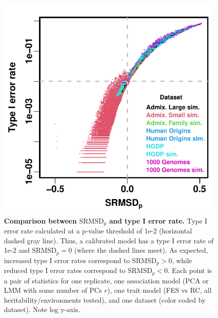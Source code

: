 \documentclass[11pt]{article}
\newcommand{\rmsd}{\text{SRMSD}_p}
\begin{document}
\begin{figure}[hp!]
  \centering
  \includegraphics{rmsd-vs-tie.pdf}
  \caption{
    {\bf Comparison between $\rmsd$ and type I error rate.}
    Type I error rate calculated at a p-value threshold of 1e-2 (horizontal dashed gray line).
    Thus, a calibrated model has a type I error rate of 1e-2 and $\rmsd = 0$ (where the dashed lines meet).
    As expected, increased type I error rates correspond to $\rmsd > 0$, while reduced type I error rates correspond to $\rmsd < 0$.
    Each point is a pair of statistics for one replicate, one association model (PCA or LMM with some number of PCs $r$), one trait model (FES vs RC, all heritability/environments tested), and one dataset (color coded by dataset).
    Note log y-axis.
  }
  \label{fig:rmsd-vs-tie}
\end{figure}
\end{document}
